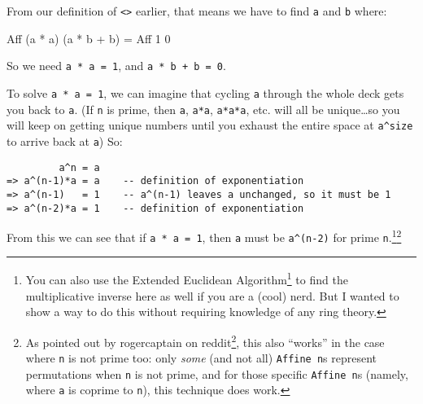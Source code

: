 \documentclass[]{article}
\newenvironment{Shaded}{}{}
\newcommand{\DataTypeTok}[1]{\textcolor[rgb]{0.56,0.13,0.00}{#1}}
\newcommand{\DecValTok}[1]{\textcolor[rgb]{0.25,0.63,0.44}{#1}}
\newcommand{\NormalTok}[1]{#1}
\newcommand{\OperatorTok}[1]{\textcolor[rgb]{0.40,0.40,0.40}{#1}}
\newcommand{\OtherTok}[1]{\textcolor[rgb]{0.00,0.44,0.13}{#1}}
\renewcommand{\href}[2]{#2\footnote{\url{#1}}}
\begin{document}
From our definition of \texttt{\textless{}\textgreater{}} earlier, that means we
have to find \texttt{a\textquotesingle{}} and \texttt{b\textquotesingle{}}
where:

\begin{Shaded}
\begin{Highlighting}[]
\DataTypeTok{Aff}\NormalTok{ (a\textquotesingle{} }\OperatorTok{*}\NormalTok{ a) (a\textquotesingle{} }\OperatorTok{*}\NormalTok{ b }\OperatorTok{+}\NormalTok{ b\textquotesingle{}) }\OtherTok{=} \DataTypeTok{Aff} \DecValTok{1} \DecValTok{0}
\end{Highlighting}
\end{Shaded}

So we need \texttt{a\textquotesingle{}\ *\ a\ =\ 1}, and
\texttt{a\textquotesingle{}\ *\ b\ +\ b\textquotesingle{}\ =\ 0}.

To solve \texttt{a\textquotesingle{}\ *\ a\ =\ 1}, we can imagine that cycling
\texttt{a} through the whole deck gets you back to \texttt{a}. (If \texttt{n} is
prime, then \texttt{a}, \texttt{a*a}, \texttt{a*a*a}, etc. will all be
unique\ldots so you will keep on getting unique numbers until you exhaust the
entire space at \texttt{a\^{}size} to arrive back at \texttt{a}) So:

\begin{verbatim}
         a^n = a
=> a^(n-1)*a = a    -- definition of exponentiation
=> a^(n-1)   = 1    -- a^(n-1) leaves a unchanged, so it must be 1
=> a^(n-2)*a = 1    -- definition of exponentiation
\end{verbatim}

From this we can see that if \texttt{a\textquotesingle{}\ *\ a\ =\ 1}, then
\texttt{a\textquotesingle{}} must be \texttt{a\^{}(n-2)} for prime
\texttt{n}.\footnote{You can also use the
  \href{https://en.wikipedia.org/wiki/Extended_Euclidean_algorithm}{Extended
  Euclidean Algorithm} to find the multiplicative inverse here as well if you
  are a (cool) nerd. But I wanted to show a way to do this without requiring
  knowledge of any ring theory.}\footnote{As
  \href{https://www.reddit.com/r/haskell/comments/jwl93i/shuffling_things_up_solving_advent_of_code_with/gct4ihy/?context=3}{pointed
  out by rogercaptain on reddit}, this also ``works'' in the case where
  \texttt{n} is not prime too: only \emph{some} (and not all)
  \texttt{Affine\ n}s represent permutations when \texttt{n} is not prime, and
  for those specific \texttt{Affine\ n}s (namely, where \texttt{a} is coprime to
  \texttt{n}), this technique does work.}
\end{document}
